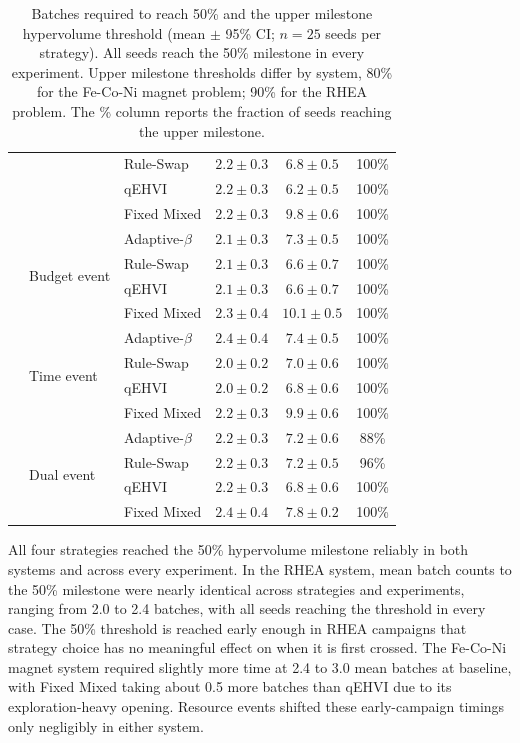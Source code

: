 \begin{table}[]
\begin{tabular}{@{}lllccc@{}}
   &  & Rule-Swap & $2.2 \pm 0.3$ & $6.8 \pm 0.5$ & 100\% \\
   &  & qEHVI & $2.2 \pm 0.3$ & $6.2 \pm 0.5$ & 100\% \\
   &  & Fixed Mixed & $2.2 \pm 0.3$ & $9.8 \pm 0.6$ & 100\% \\
  \addlinespace[2pt]
   & \multirow{4}{*}{Budget event} & Adaptive-$\beta$ & $2.1 \pm 0.3$ & $7.3 \pm 0.5$ & 100\% \\
   &  & Rule-Swap & $2.1 \pm 0.3$ & $6.6 \pm 0.7$ & 100\% \\
   &  & qEHVI & $2.1 \pm 0.3$ & $6.6 \pm 0.7$ & 100\% \\
   &  & Fixed Mixed & $2.3 \pm 0.4$ & $10.1 \pm 0.5$ & 100\% \\
  \addlinespace[2pt]
   & \multirow{4}{*}{Time event} & Adaptive-$\beta$ & $2.4 \pm 0.4$ & $7.4 \pm 0.5$ & 100\% \\
   &  & Rule-Swap & $2.0 \pm 0.2$ & $7.0 \pm 0.6$ & 100\% \\
   &  & qEHVI & $2.0 \pm 0.2$ & $6.8 \pm 0.6$ & 100\% \\
   &  & Fixed Mixed & $2.2 \pm 0.3$ & $9.9 \pm 0.6$ & 100\% \\
  \addlinespace[2pt]
   & \multirow{4}{*}{Dual event} & Adaptive-$\beta$ & $2.2 \pm 0.3$ & $7.2 \pm 0.6$ & 88\% \\
   &  & Rule-Swap & $2.2 \pm 0.3$ & $7.2 \pm 0.5$ & 96\% \\
   &  & qEHVI & $2.2 \pm 0.3$ & $6.8 \pm 0.6$ & 100\% \\
   &  & Fixed Mixed & $2.4 \pm 0.4$ & $7.8 \pm 0.2$ & 100\% \\
\bottomrule
\end{tabular}
\caption{Batches required to reach 50\% and the upper milestone hypervolume threshold (mean $\pm$ 95\% CI; $n = 25$ seeds per strategy). All seeds reach the 50\% milestone in every experiment. Upper milestone thresholds differ by system, 80\% for the Fe-Co-Ni magnet problem; 90\% for the RHEA problem. The \% column reports the fraction of seeds reaching the upper milestone.}
\label{tab:convergence-speed}
\end{table}

All four strategies reached the 50\% hypervolume milestone reliably in both systems and across every experiment. In the RHEA system, mean batch counts to the 50\% milestone were nearly identical across strategies and experiments, ranging from 2.0 to 2.4 batches, with all seeds reaching the threshold in every case. The 50\% threshold is reached early enough in RHEA campaigns that strategy choice has no meaningful effect on when it is first crossed. The Fe-Co-Ni magnet system required slightly more time at 2.4 to 3.0 mean batches at baseline, with Fixed Mixed taking about 0.5 more batches than qEHVI due to its exploration-heavy opening. Resource events shifted these early-campaign timings only negligibly in either system.

